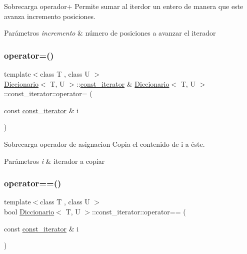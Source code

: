 Sobrecarga operador+ Permite sumar al iterdor un entero de manera que este avanza incremento posiciones. 


\begin{DoxyParams}{Parámetros}
{\em incremento} & número de posiciones a avanzar el iterador \\
\hline
\end{DoxyParams}
\mbox{\label{classDiccionario_1_1const__iterator_a97cbf774b9b669edef100ef9f42fc8d4}} 
\subsubsection{\texorpdfstring{operator=()}{operator=()}}
{\footnotesize\ttfamily template$<$class T , class U $>$ \\
\hyperlink{classDiccionario}{Diccionario}$<$ T, U $>$\+::\hyperlink{classDiccionario_1_1const__iterator}{const\+\_\+iterator} \& \hyperlink{classDiccionario}{Diccionario}$<$ T, U $>$\+::const\+\_\+iterator\+::operator= (\begin{DoxyParamCaption}\item[{const \hyperlink{classDiccionario_1_1const__iterator}{const\+\_\+iterator} \&}]{i }\end{DoxyParamCaption})}



Sobrecarga operador de asignacion Copia el contenido de i a éste. 


\begin{DoxyParams}{Parámetros}
{\em i} & iterador a copiar \\
\hline
\end{DoxyParams}
\mbox{\label{classDiccionario_1_1const__iterator_ad555aa24c339252bb623f04054893a51}} 
\subsubsection{\texorpdfstring{operator==()}{operator==()}}
{\footnotesize\ttfamily template$<$class T , class U $>$ \\
bool \hyperlink{classDiccionario}{Diccionario}$<$ T, U $>$\+::const\+\_\+iterator\+::operator== (\begin{DoxyParamCaption}\item[{const \hyperlink{classDiccionario_1_1const__iterator}{const\+\_\+iterator} \&}]{i }\end{DoxyParamCaption})}



